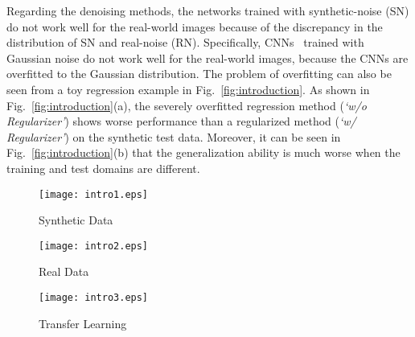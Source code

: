 \documentclass[10pt,twocolumn,letterpaper]{article}
\begin{document}
Regarding the denoising methods, the networks trained with synthetic-noise (SN) do not work well for the real-world images because of the discrepancy in the distribution of SN and real-noise (RN).
Specifically, CNNs~\cite{zhang2017beyond, zhang2017learning, zhang2018ffdnet} trained with Gaussian noise do not work well for the real-world images, because the CNNs are overfitted to the Gaussian distribution. The problem of overfitting can also be seen from a toy regression example in Fig.~\ref{fig:introduction}.
As shown in Fig.~\ref{fig:introduction}(a), the severely overfitted regression method (\textit{`w/o Regularizer'}) shows worse performance than a regularized method (\textit{`w/ Regularizer'}) on the synthetic test data.
Moreover, it can be seen in Fig.~\ref{fig:introduction}(b) that the generalization ability is much worse when the training and test domains are different.

\begin{figure*}[t]
	\centering	
	\begin{subfigure}[b]{0.29\textwidth}		
		\texttt{[image: intro1.eps]} 
		\caption{Synthetic Data}		
	\end{subfigure}	
	\begin{subfigure}[b]{0.29\textwidth}		
		\texttt{[image: intro2.eps]} 
		\caption{Real Data}		
	\end{subfigure}	
	\begin{subfigure}[b]{0.29\textwidth}		
		\texttt{[image: intro3.eps]} 
		\caption{Transfer Learning}		
	\end{subfigure}	
	\caption{
			A toy regression example presenting the effects of regularization and transfer learning.
		(a) We assume that training and test data are sampled from a 5th order polynomial, with additive white Gaussian noise (AWGN).
The original regression model (without regularizer) is denoted as \textit{w/o Regularizer}, which is a 10th order polynomial model. As well know, the higher-order model overfits the data. Assuming that a regularization method successfully degenerates the model to a 6th order one (\textit{w/ Regularizer}), then overfitting is relieved.
It can be seen from mean squared error (MSE) on synthetic test data that the regularization can enhance the performance when training and test distributions are the same.
		(b) 
We assume another 5th-order polynomial that generates a real data that has some domain difference from the synthetic one.
It can be seen from the MSE on real test data that the regularization is essential for processing other distributions.
		(c) Transfer learning regression method \textit{w/ Regularizer + TF} is fine-tuned with few real data samples from \textit{w/ Regularizer}.
		It can be seen from the MSE on real test data that transfer learning can be trained efficiently with few real training samples.
	}
	\label{fig:introduction}	
\end{figure*}
\end{document}
